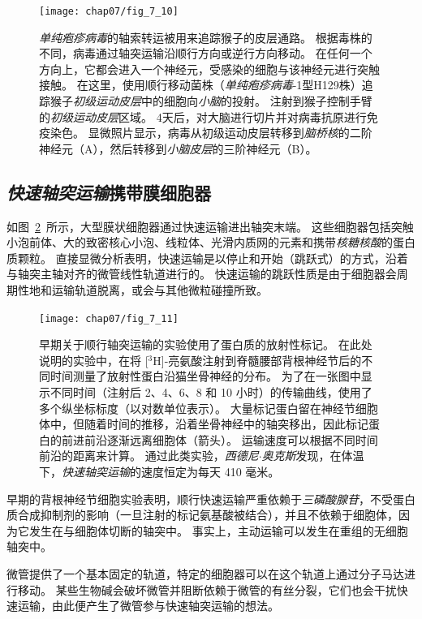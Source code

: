 \begin{figure}[htbp]
	\centering
	\texttt{[image: chap07/fig\_7\_10]}
	\caption{\textit{单纯疱疹病毒}的轴索转运被用来追踪猴子的皮层通路。
		根据毒株的不同，病毒通过轴突运输沿顺行方向或逆行方向移动。
		在任何一个方向上，它都会进入一个神经元，受感染的细胞与该神经元进行突触接触。
		在这里，使用顺行移动菌株（\textit{单纯疱疹病毒}-1型H129株）追踪猴子\textit{初级运动皮层}中的细胞向\textit{小脑}的投射。
		注射到猴子控制手臂的\textit{初级运动皮层}区域。
		4天后，对大脑进行切片并对病毒抗原进行免疫染色。
		显微照片显示，病毒从初级运动皮层转移到\textit{脑桥核}的二阶神经元（A），然后转移到\textit{小脑皮层}的三阶神经元（B）。}
	\label{fig:7_10}
\end{figure}



\subsection{\textit{快速轴突运输}携带膜细胞器}

如图~\ref{fig:7_11}~所示，大型膜状细胞器通过快速运输进出轴突末端。
这些细胞器包括突触小泡前体、大的致密核心小泡、线粒体、光滑内质网的元素和携带\textit{核糖核酸}的蛋白质颗粒。
直接显微分析表明，快速运输是以停止和开始（跳跃式）的方式，沿着与轴突主轴对齐的微管线性轨道进行的。
快速运输的跳跃性质是由于细胞器会周期性地和运输轨道脱离，或会与其他微粒碰撞所致。


\begin{figure}[htbp]
	\centering
	\texttt{[image: chap07/fig\_7\_11]}
	\caption{早期关于顺行轴突运输的实验使用了蛋白质的放射性标记。
		在此处说明的实验中，在将 [$^3$H]-亮氨酸注射到脊髓腰部背根神经节后的不同时间测量了放射性蛋白沿猫坐骨神经的分布。
		为了在一张图中显示不同时间（注射后 2、4、6、8 和 10 小时）的传输曲线，使用了多个纵坐标标度（以对数单位表示）。
		大量标记蛋白留在神经节细胞体中，但随着时间的推移，沿着坐骨神经中的轴突移出，因此标记蛋白的前进前沿逐渐远离细胞体（箭头）。
		运输速度可以根据不同时间前沿的距离来计算。
		通过此类实验，\textit{西德尼$\cdot$奥克斯}发现，在体温下，\textit{快速轴突运输}的速度恒定为每天 410 毫米\cite{ochs1972fast}。}
	\label{fig:7_11}
\end{figure}


早期的背根神经节细胞实验表明，顺行快速运输严重依赖于\textit{三磷酸腺苷}，不受蛋白质合成抑制剂的影响（一旦注射的标记氨基酸被结合），并且不依赖于细胞体，因为它发生在与细胞体切断的轴突中。
事实上，主动运输可以发生在重组的无细胞轴突中。


微管提供了一个基本固定的轨道，特定的细胞器可以在这个轨道上通过分子马达进行移动。
某些生物碱会破坏微管并阻断依赖于微管的有丝分裂，它们也会干扰快速运输，由此便产生了微管参与快速轴突运输的想法。


